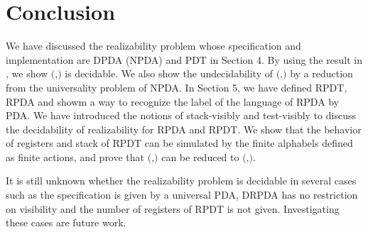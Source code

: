 \section{Conclusion}
We have discussed the realizability problem
whose specification and implementation are
DPDA (NPDA) and PDT in Section 4.
By using the result in \cite{Wa96},
we show \Real$($\DPDA,\PDT$)$ is decidable.
We also show the undecidability of \Real$($\NPDA,\PDT$)$
by a reduction from the universality problem of NPDA.
In Section 5, we have defined RPDT, RPDA and
showm a way to recognize the label of the language of RPDA by PDA.
We have introduced the notions of stack-visibly \cite{AM04} and
test-visibly to discuss the decidability of realizability
for RPDA and RPDT.
We show that the behavior of registers and stack of RPDT
can be simulated by the finite alphabels defined as finite actions,
and prove that \Real$($\DRPDAv,\RPDTk$)$ can be reduced to \Real$($\DPDA,\PDT$)$.

It is still unknown whether the realizability problem is decidable
in several cases such as
the specification is given by a universal PDA,
DRPDA has no restriction on visibility and
the number of registers of RPDT is not given.
Investigating these cases are future work.
